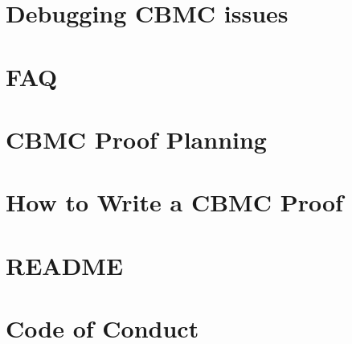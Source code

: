 \documentclass[twoside]{book}
\newcommand{\+}{\discretionary{\mbox{\scriptsize$\hookleftarrow$}}{}{}}
\begin{document}
\chapter{Debugging CBMC issues}
\label{md_crt_aws_crt_cpp_crt_aws_c_common_verification_cbmc_templates_training_material__d_e_b_u_g__c_b_m_c}

\chapter{FAQ}
\label{md_crt_aws_crt_cpp_crt_aws_c_common_verification_cbmc_templates_training_material__f_a_q}

\chapter{CBMC Proof Planning}
\label{md_crt_aws_crt_cpp_crt_aws_c_common_verification_cbmc_templates_training_material__p_l_a_n_n_i_n_g}

\chapter{How to Write a CBMC Proof}
\label{md_crt_aws_crt_cpp_crt_aws_c_common_verification_cbmc_templates_training_material__p_r_o_o_f__w_r_i_t_i_n_g}

\chapter{README}
\label{md_crt_aws_crt_cpp_crt_aws_c_common_verification_cbmc_templates_training_material__r_e_a_d_m_e}

\chapter{Code of Conduct}
\label{md_crt_aws_crt_cpp_crt_aws_c_compression__c_o_d_e__o_f__c_o_n_d_u_c_t}

\end{document}
